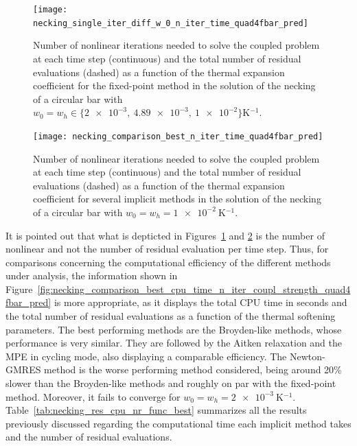      \begin{figure}[htbp]
       \centering
       \texttt{[image: necking\_single\_iter\_diff\_w\_0\_n\_iter\_time\_quad4fbar\_pred]}
       \caption{Number of nonlinear iterations needed to solve the coupled problem at each time step (continuous) and the total number of residual evaluations (dashed) as a function of the thermal expansion coefficient for the fixed-point method in the solution of the necking of a circular bar with \(w_0=w_h\in\{\num{2e-3},\ \num{4.89e-3},\ \num{1e-2}\}\si{\kelvin^{-1}}\).}
       \label{fig:necking_single_iter_diff_w_0_n_iter_time_quad4fbar_pred}
     \end{figure}

     \begin{figure}[!hbtp]
       \centering
       \texttt{[image: necking\_comparison\_best\_n\_iter\_time\_quad4fbar\_pred]}
       \caption{Number of nonlinear iterations needed to solve the coupled problem at each time step (continuous) and the total number of residual evaluations (dashed) as a function of the thermal expansion coefficient for several implicit methods in the solution of the necking of a circular bar with \(w_0=w_h=\SI{1e-2}{\kelvin^{-1}}\).}
       \label{fig:necking_comparison_best_n_iter_time_quad4fbar_pred}
     \end{figure}


     It is pointed out that what is depticted in Figures~\ref{fig:necking_single_iter_diff_w_0_n_iter_time_quad4fbar_pred} and \ref{fig:necking_comparison_best_n_iter_time_quad4fbar_pred} is the number of nonlinear and not the number of residual evaluation per time step.
     Thus, for comparisons concerning the computational efficiency of the different methods under analysis, the information shown in
     Figure~\ref{fig:necking_comparison_best_cpu_time_n_iter_coupl_strength_quad4fbar_pred} is more appropriate, as it displays the total CPU time in seconds and the total number of residual evaluations as a function of the thermal softening parameters.
     The best performing methods are the Broyden-like methods, whose performance is very similar.
     They are followed by the Aitken relaxation and the MPE in cycling mode, also displaying a comparable efficiency.
     The Newton-GMRES method is the worse performing method considered, being around 20\% slower than the Broyden-like methods and roughly on par with the fixed-point method.
     Moreover, it fails to converge for \(w_0=w_h=\SI{2e-3}{\kelvin^{-1}}\).
     Table~\ref{tab:necking_res_cpu_nr_func_best} summarizes all the results previously discussed regarding the computational time each implicit method takes and the number of residual evaluations.


